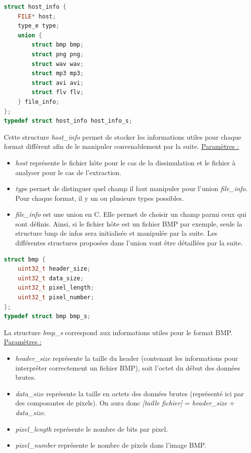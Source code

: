 \documentclass[11pt]{article}
\begin{document}
\begin{lstlisting}[language=c]
struct host_info {
    FILE* host;
    type_e type;
    union {
        struct bmp bmp;
        struct png png;
        struct wav wav;
        struct mp3 mp3;
        struct avi avi;
        struct flv flv;
    } file_info;
};
typedef struct host_info host_info_s;
\end{lstlisting}

Cette structure \textit{host\_info} permet de stocker les informations 
utiles pour chaque format différent afin de le manipuler convenablement 
par la suite. 
\newline
\underline{Paramètres :}
\begin{itemize}
\item \textit{host} représente le fichier hôte pour le cas de la dissimulation 
et le fichier à analyser pour le cas de l'extraction. 
\item \textit{type} permet de distinguer quel champ il faut manipuler pour l'union 
\textit{file\_info}. Pour chaque format, il y un ou plusieurs types possibles.
\item \textit{file\_info} est une union en C. Elle permet de choisir un champ parmi
ceux qui sont définis. Ainsi, si le fichier hôte est un fichier BMP par exemple, 
seule la structure bmp de infos sera initialisée et manipulée par la suite. 
Les différentes structures proposées dans l'union vont être détaillées par 
la suite.
\newline
\end{itemize}

\begin{lstlisting}[language=c]
struct bmp {
    uint32_t header_size;
    uint32_t data_size;
    uint32_t pixel_length;
    uint32_t pixel_number;
};
typedef struct bmp bmp_s;
\end{lstlisting}

La structure \textit{bmp\_s} correspond aux informations 
utiles pour le format BMP.  
\newline
\underline{Paramètres :}
\begin{itemize}
\item \textit{header\_size} représente la taille du header (contenant les 
informations pour interpréter correctement un fichier BMP), soit l'octet 
du début des données brutes. 
\item \textit{data\_size} représente la taille en octets des données brutes 
(représenté ici par des composantes de pixels). On aura donc 
\textit{[taille fichier]} = \textit{header\_size} + \textit{data\_size}.
\item \textit{pixel\_length} représente le nombre de bits par pixel. 
\item \textit{pixel\_number} représente le nombre de pixels dans l'image BMP. 
\newline
\end{itemize}
\end{document}
